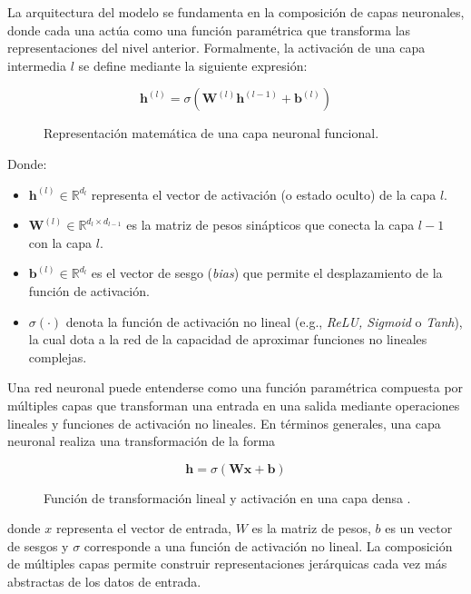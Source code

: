 \documentclass[12pt]{report}
\begin{document}
La arquitectura del modelo se fundamenta en la composición de capas neuronales, donde cada una actúa como una función paramétrica que transforma las representaciones del nivel anterior. Formalmente, la activación de una capa intermedia $l$ se define mediante la siguiente expresión:

\begin{figure}[h]
    \centering
    \[
    \mathbf{h}^{(l)} = \sigma \left( \mathbf{W}^{(l)} \mathbf{h}^{(l-1)} + \mathbf{b}^{(l)} \right)
    \]
    \caption{Representación matemática de una capa neuronal funcional. \cite{goodfellow2016deep}}
    \label{fig:neural_layer}
\end{figure}

Donde:
\begin{itemize}
    \item $\mathbf{h}^{(l)} \in \mathbb{R}^{d_l}$ representa el vector de activación (o estado oculto) de la capa $l$.
    \item $\mathbf{W}^{(l)} \in \mathbb{R}^{d_l \times d_{l-1}}$ es la matriz de pesos sinápticos que conecta la capa $l-1$ con la capa $l$.
    \item $\mathbf{b}^{(l)} \in \mathbb{R}^{d_l}$ es el vector de sesgo (\textit{bias}) que permite el desplazamiento de la función de activación.
    \item $\sigma(\cdot)$ denota la función de activación no lineal (e.g., \textit{ReLU, Sigmoid} o \textit{Tanh}), la cual dota a la red de la capacidad de aproximar funciones no lineales complejas.
\end{itemize}

Una red neuronal puede entenderse como una función paramétrica compuesta por múltiples capas que transforman una entrada en una salida mediante operaciones lineales y funciones de activación no lineales. En términos generales, una capa neuronal realiza una transformación de la forma

\begin{figure}[htbp]
    \centering
    \begin{equation}
        \mathbf{h} = \sigma(\mathbf{W}\mathbf{x} + \mathbf{b})
        \label{eq:capa_neuronal}
    \end{equation}
    \caption{Función de transformación lineal y activación en una capa densa \cite{lecun2015deep}.}
\end{figure}



donde $x$ representa el vector de entrada, $W$ es la matriz de pesos, $b$ es un vector de sesgos y $\sigma$ corresponde a una función de activación no lineal. La composición de múltiples capas permite construir representaciones jerárquicas cada vez más abstractas de los datos de entrada.
\end{document}
